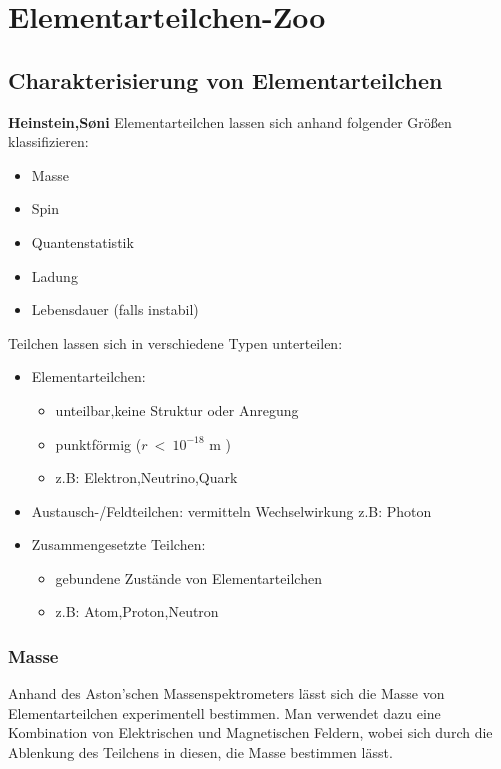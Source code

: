 \documentclass[Ex4_Zusammenfassung.tex]{subfiles}
\begin{document}
\chapter{Elementarteilchen-Zoo}	
\section{Charakterisierung von Elementarteilchen}
\textbf{Heinstein,S\o{}ni} \newline
Elementarteilchen lassen sich anhand folgender Größen klassifizieren:
\begin{itemize}
\item Masse
\item Spin
\item Quantenstatistik
\item Ladung
\item Lebensdauer (falls instabil)
\end{itemize}
Teilchen lassen sich  in verschiedene Typen unterteilen: 
\begin{itemize}
\item Elementarteilchen: \begin{itemize}
						\item unteilbar,keine Struktur oder Anregung
						\item punktförmig ($ r \ < \ 10^{-18} $ m )
						\item z.B: Elektron,Neutrino,Quark
						\end{itemize}
\item Austausch-/Feldteilchen: vermitteln Wechselwirkung z.B: Photon
\item Zusammengesetzte Teilchen: \begin{itemize}
						\item gebundene Zustände von Elementarteilchen
						\item z.B: Atom,Proton,Neutron
								\end{itemize}
\end{itemize} \newpage
\subsection*{Masse}
Anhand des Aston'schen Massenspektrometers lässt sich die Masse von Elementarteilchen experimentell bestimmen. 
Man verwendet dazu eine Kombination von Elektrischen und Magnetischen Feldern, wobei sich durch die Ablenkung des Teilchens in diesen, die Masse bestimmen lässt. 
\end{document}
